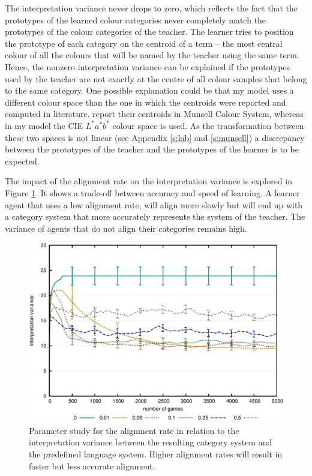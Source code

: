 The interpretation variance never drops to zero, which reflects the
fact that the prototypes of the learned colour categories never
completely match the prototypes of the colour categories of the
teacher. The learner tries to position the prototype of each category
on the centroid of a term -- the most central colour of all the colours that will
be named by the teacher using the same term. Hence, the nonzero
interpretation variance can be explained if the prototypes used by the
teacher are not exactly at the centre of all colour samples that
belong to the same category. One possible explanation could be that
my model uses a different colour space than the one in which the
centroids were reported and computed in literature. \cite{sturges95location}
report their centroids in Munsell Colour System, 
whereas in my model the CIE $L^*a^*b^*$ colour space is used. 
As the transformation between these two spaces is not linear 
(see Appendix \ref{s:lab} and \ref{s:munsell}) a discrepancy between the prototypes 
of the teacher and the prototypes of the learner is to be expected.

The impact of the alignment rate on the interpretation variance is
explored in Figure
\ref{f:basic-strategy-alignment-rate-vs-variance}. It shows a
trade-off between accuracy and speed of learning. A learner agent that
uses a low alignment rate, will align more slowly but will end up
with a category system that more accurately represents the system of
the teacher. The variance of agents that do not align their categories
remains high.

\begin{figure}[htbp]
  \begin{center}
    \includegraphics[width=.8\textwidth]{./basic-operators/figures/alignment-rate-vs-variance.pdf}
    \caption[Parameter study for alignment rate]{Parameter study for
      the alignment rate in relation to the interpretation variance
      between the resulting category system and the predefined
      language system. Higher alignment rates will result in faster
      but less accurate alignment.}
    \label{f:basic-strategy-alignment-rate-vs-variance}
  \end{center}
\end{figure}

